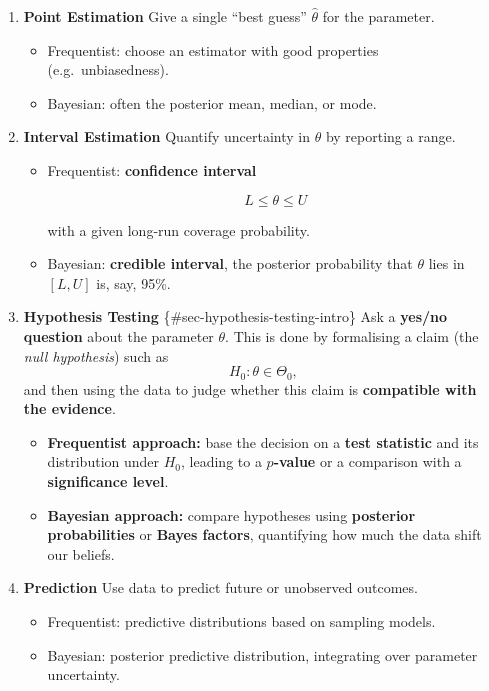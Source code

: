 \documentclass[
  letterpaper,
  DIV=11,
  numbers=noendperiod]{scrreprt}
\providecommand{\tightlist}{%
  \setlength{\itemsep}{0pt}\setlength{\parskip}{0pt}}
\theoremstyle{definition}
\theoremstyle{plain}
\theoremstyle{definition}
\theoremstyle{remark}
\begin{document}
\begin{enumerate}
\def\labelenumi{\arabic{enumi}.}
\item
  \textbf{Point Estimation} Give a single ``best guess''
  \(\hat{\theta}\) for the parameter.

  \begin{itemize}
  \tightlist
  \item
    Frequentist: choose an estimator with good properties
    (e.g.~unbiasedness).
  \item
    Bayesian: often the posterior mean, median, or mode.
  \end{itemize}
\item
  \textbf{Interval Estimation} Quantify uncertainty in \(\theta\) by
  reporting a range.

  \begin{itemize}
  \item
    Frequentist: \textbf{confidence interval}

    \[
    L \leq \theta \leq U
    \]

    with a given long-run coverage probability.
  \item
    Bayesian: \textbf{credible interval}, the posterior probability that
    \(\theta\) lies in \([L,U]\) is, say, 95\%.
  \end{itemize}
\item
  \textbf{Hypothesis Testing} \{\#sec-hypothesis-testing-intro\} Ask a
  \textbf{yes/no question} about the parameter \(\theta\). This is done
  by formalising a claim (the \emph{null hypothesis}) such as \[
       H_0: \theta \in \Theta_0,
   \] and then using the data to judge whether this claim is
  \textbf{compatible with the evidence}.

  \begin{itemize}
  \tightlist
  \item
    \textbf{Frequentist approach:} base the decision on a \textbf{test
    statistic} and its distribution under \(H_0\), leading to a
    \textbf{\(p\)-value} or a comparison with a \textbf{significance
    level}.
  \item
    \textbf{Bayesian approach:} compare hypotheses using
    \textbf{posterior probabilities} or \textbf{Bayes factors},
    quantifying how much the data shift our beliefs.
  \end{itemize}
\item
  \textbf{Prediction} Use data to predict future or unobserved outcomes.

  \begin{itemize}
  \tightlist
  \item
    Frequentist: predictive distributions based on sampling models.
  \item
    Bayesian: posterior predictive distribution, integrating over
    parameter uncertainty.
  \end{itemize}
\end{enumerate}
\end{document}
